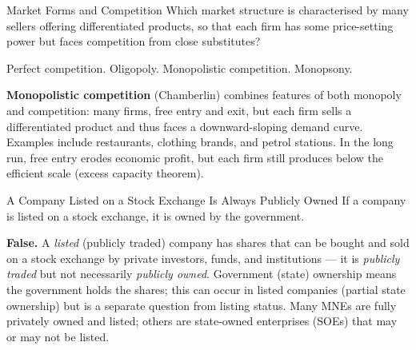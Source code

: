 \documentclass[paper=a5]{scrartcl}
\begin{document}
\begin{question}[type=mc]{Market Forms and Competition}
Which market structure is characterised by many sellers offering
differentiated products, so that each firm has some price-setting power
but faces competition from close substitutes?
\begin{choices}
  \choice        Perfect competition.
  \choice        Oligopoly.
  \correctchoice Monopolistic competition.
  \choice        Monopsony.
\end{choices}
\begin{solution}
  \textbf{Monopolistic competition} (Chamberlin) combines features of both
  monopoly and competition: many firms, free entry and exit, but each firm
  sells a differentiated product and thus faces a downward-sloping demand
  curve. Examples include restaurants, clothing brands, and petrol stations.
  In the long run, free entry erodes economic profit, but each firm still
  produces below the efficient scale (excess capacity theorem).
\end{solution}
\end{question}

\begin{question}[type=tf]{A Company Listed on a Stock Exchange Is Always Publicly
  Owned}
If a company is listed on a stock exchange, it is owned by the government.
\truefalse[false]
\begin{solution}
  \textbf{False.} A \emph{listed} (publicly traded) company has shares that
  can be bought and sold on a stock exchange by private investors, funds,
  and institutions --- it is \emph{publicly traded} but not necessarily
  \emph{publicly owned}. Government (state) ownership means the government
  holds the shares; this can occur in listed companies (partial state
  ownership) but is a separate question from listing status. Many MNEs are
  fully privately owned and listed; others are state-owned enterprises (SOEs)
  that may or may not be listed.
\end{solution}
\end{question}
\end{document}
